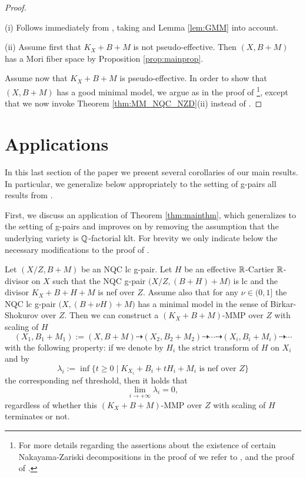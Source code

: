 	\begin{proof}~
		
		\medskip
		
		\noindent (i) Follows immediately from \cite[Theorem 4.5]{Hash22c}, taking \cite[Theorem 1.7]{HH20} and Lemma \ref{lem:GMM} into account.
		
		\medskip
		
		\noindent (ii)
		Assume first that $ K_X+B+M $ is not pseudo-effective. Then $ (X,B+M) $ has a Mori fiber space by Proposition \ref{prop:mainprop}.
		
		Assume now that $K_X+B+M$ is pseudo-effective. In order to show that $(X,B+M)$ has a good minimal model, we argue as in the proof of \cite[Theorem 4.5]{Hash22c}\footnote{For more details regarding the assertions about the existence of certain Nakayama-Zariski decompositions in the proof of \cite[Theorem 4.5]{Hash22c} we refer to \cite[Lemma 4.1(2)]{BH14b}, \cite[Remark 3.21]{Tsak21} and the proof of \cite[Proposition 3.26]{Tsak21}.}, except that we now invoke Theorem \ref{thm:MM_NQC_NZD}(ii) instead of \cite[Theorem 2.23]{Hash20d}.
	\end{proof}
	
	
	
	
	\section{Applications}
	\label{section:applications}
	
	In this last section of the paper we present several corollaries of our main results. In particular, we generalize below appropriately to the setting of g-pairs all results from \cite[Subsection 3.2]{Hash20d}.
	
	First, we discuss an application of Theorem \ref{thm:mainthm}, which generalizes \cite[Lemma 2.12]{Hash20d} to the setting of g-pairs and improves on \cite[Lemma 2.9]{LX22a} by removing the assumption that the underlying variety is $ \mathbb{Q} $-factorial klt. For brevity we only indicate below the necessary modifications to the proof of \cite[Lemma 2.9]{LX22a}.
	
	\begin{lem}\label{lem:scaling_numbers_to_zero}
		Let $(X/Z,B+M)$ be an NQC lc g-pair. Let $H$ be an effective $\mathbb{R}$-Cartier $\mathbb{R}$-divisor on $X$ such that the NQC g-pair $\big(X/Z, (B+H)+M \big)$ is lc and the divisor $K_X+B+H+M$ is nef over $Z$. Assume also that for any $\nu \in (0,1]$ the NQC lc g-pair $ \big(X, (B + \nu H) + M \big)$ has a minimal model in the sense of Birkar-Shokurov over $ Z $. Then we can construct a $(K_X+B+M)$-MMP over $Z$ with scaling of $H$
		$$(X_1, B_1+M_1) := (X,B+M) \dashrightarrow (X_2,B_2+M_2) \dashrightarrow \cdots \dashrightarrow (X_i,B_i+M_i)\dashrightarrow \cdots$$
		with the following property: if we denote by $H_i$ the strict transform of $H$ on $X_i$ and by 
		$$ \lambda_i := \inf \{ t \geq 0 \mid K_{X_i}+B_i+tH_i+M_i \text{ is nef over } Z \} $$
		the corresponding nef threshold, then it holds that 
		\[ \lim_{i \to +\infty}\lambda_i=0 , \]
		regardless of whether this $ (K_X+B+M) $-MMP over $ Z $ with scaling of $H$ terminates or not.
	\end{lem}
	
